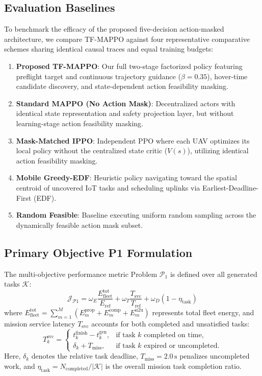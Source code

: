 \subsection{Evaluation Baselines}
To benchmark the efficacy of the proposed five-decision action-masked architecture, we compare \textsc{TF-MAPPO} against four representative comparative schemes sharing identical causal traces and equal training budgets:
\begin{enumerate}
    \item \textbf{Proposed TF-MAPPO}: Our full two-stage factorized policy featuring preflight target and continuous trajectory guidance ($\beta = 0.35$), hover-time candidate discovery, and state-dependent action feasibility masking.
    \item \textbf{Standard MAPPO (No Action Mask)}: Decentralized actors with identical state representation and safety projection layer, but without learning-stage action feasibility masking.
    \item \textbf{Mask-Matched IPPO}: Independent PPO where each UAV optimizes its local policy without the centralized state critic ($V(s)$), utilizing identical action feasibility masking.
    \item \textbf{Mobile Greedy-EDF}: Heuristic policy navigating toward the spatial centroid of uncovered IoT tasks and scheduling uplinks via Earliest-Deadline-First (EDF).
    \item \textbf{Random Feasible}: Baseline executing uniform random sampling across the dynamically feasible action mask subset.
\end{enumerate}

\subsection{Primary Objective P1 Formulation}
The multi-objective performance metric Problem $\mathcal{P}_1$ is defined over all generated tasks $\mathcal{K}$:
\begin{equation}
    \mathcal{J}_{\mathcal{P}1} = \omega_E \frac{E_{\mathrm{fleet}}^{\mathrm{tot}}}{E_{\mathrm{ref}}} + \omega_T \frac{T_{\mathrm{svc}}}{T_{\mathrm{ref}}} + \omega_D (1 - \eta_{\mathrm{task}})
\end{equation}
where $E_{\mathrm{fleet}}^{\mathrm{tot}} = \sum_{m=1}^M (E_m^{\mathrm{prop}} + E_m^{\mathrm{comp}} + E_m^{\mathrm{u2u}})$ represents total fleet energy, and mission service latency $T_{\mathrm{svc}}$ accounts for both completed and unsatisfied tasks:
\begin{equation}
    T_k^{\mathrm{svc}} = 
    \begin{cases} 
      t_{k}^{\mathrm{finish}} - t_{k}^{\mathrm{gen}}, & \text{if task } k \text{ completed on time,} \\
      \delta_k + T_{\mathrm{miss}}, & \text{if task } k \text{ expired or uncompleted.}
    \end{cases}
\end{equation}
Here, $\delta_k$ denotes the relative task deadline, $T_{\mathrm{miss}} = 2.0\,\mathrm{s}$ penalizes uncompleted work, and $\eta_{\mathrm{task}} = N_{\mathrm{completed}} / |\mathcal{K}|$ is the overall mission task completion ratio.

